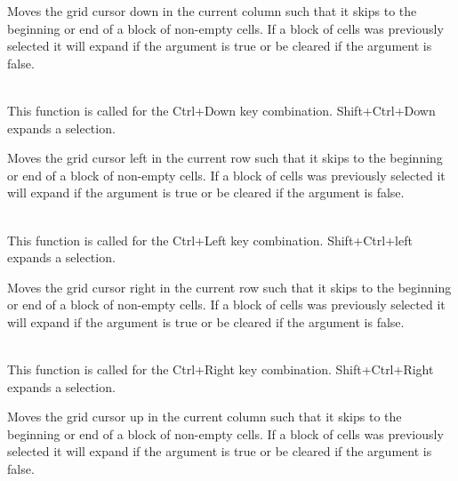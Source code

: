 
Moves the grid cursor down in the current column such that it skips to the beginning or
end of a block of non-empty cells. If a block of cells was previously selected it
will expand if the argument is true or be cleared if the argument is false.

\\
This function is called for the Ctrl+Down key combination. Shift+Ctrl+Down expands a selection.



\label{wxgridmovecursorleftblock}


Moves the grid cursor left in the current row such that it skips to the beginning or
end of a block of non-empty cells. If a block of cells was previously selected it
will expand if the argument is true or be cleared if the argument is false.

\\
This function is called for the Ctrl+Left key combination. Shift+Ctrl+left expands a selection.



\label{wxgridmovecursorrightblock}


Moves the grid cursor right in the current row such that it skips to the beginning or
end of a block of non-empty cells. If a block of cells was previously selected it
will expand if the argument is true or be cleared if the argument is false.

\\
This function is called for the Ctrl+Right key combination. Shift+Ctrl+Right expands a selection.



\label{wxgridmovecursorupblock}


Moves the grid cursor up in the current column such that it skips to the beginning or
end of a block of non-empty cells. If a block of cells was previously selected it
will expand if the argument is true or be cleared if the argument is false.

